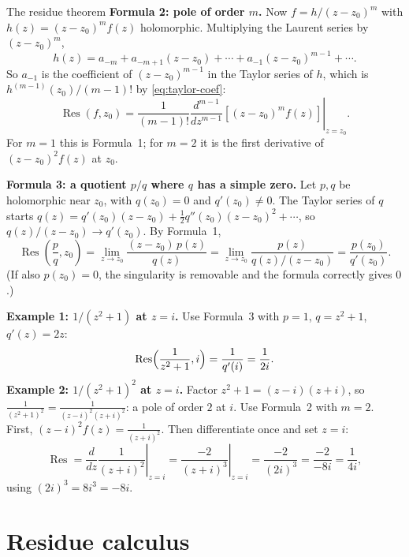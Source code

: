 \documentclass[11pt]{beamer}
\begin{document}
\begin{frame}[allowframebreaks=1.00]{The residue theorem}
\textbf{Formula 2: pole of order \(m\).} Now \(f=h/(z-z_0)^m\) with \(h(z)=(z-z_0)^mf(z)\) holomorphic.
Multiplying the Laurent series by \((z-z_0)^m\),
\[
 h(z)=a_{-m}+a_{-m+1}(z-z_0)+\cdots+a_{-1}(z-z_0)^{m-1}+\cdots .
\]
So \(a_{-1}\) is the coefficient of \((z-z_0)^{m-1}\) in the Taylor series of \(h\), which is
\(h^{(m-1)}(z_0)/(m-1)!\) by \eqref{eq:taylor-coef}:
\begin{equation}
 \operatorname{Res}(f,z_0)
 =\frac{1}{(m-1)!}
  \left.\frac{d^{m-1}}{dz^{m-1}}
  \left[(z-z_0)^m f(z)\right]\right|_{z=z_0}.
 \label{eq:res-order-m}
\end{equation}
For \(m=1\) this is Formula~1; for \(m=2\) it is the first derivative of \((z-z_0)^2f(z)\) at \(z_0\).


\textbf{Formula 3: a quotient \(p/q\) where \(q\) has a simple zero.} Let \(p,q\) be holomorphic near
\(z_0\), with \(q(z_0)=0\) and \(q'(z_0)\ne0\). The Taylor series of \(q\) starts
\(q(z)=q'(z_0)(z-z_0)+\frac12q''(z_0)(z-z_0)^2+\cdots\), so \(q(z)/(z-z_0)\to q'(z_0)\). By Formula~1,
\begin{equation}
 \operatorname{Res}\left(\frac pq,z_0\right)
 =\lim_{z\to z_0}\frac{(z-z_0)\,p(z)}{q(z)}
 =\lim_{z\to z_0}\frac{p(z)}{q(z)/(z-z_0)}
 =\frac{p(z_0)}{q'(z_0)}.
 \label{eq:res-ratio}
\end{equation}
(If also \(p(z_0)=0\), the singularity is removable and the formula correctly gives \(0\).)


\textbf{Example 1: \(1/(z^2+1)\) at \(z=i\).} Use Formula~3 with \(p=1\), \(q=z^2+1\), \(q'(z)=2z\):
\[
 \operatorname{Res}\Bigl(\frac1{z^2+1},i\Bigr)=\frac{1}{q'(i)}=\frac1{2i}.
\]
\textbf{Example 2: \(1/(z^2+1)^2\) at \(z=i\).} Factor \(z^2+1=(z-i)(z+i)\), so
\(\frac1{(z^2+1)^2}=\frac1{(z-i)^2(z+i)^2}\): a pole of order \(2\) at \(i\). Use Formula~2 with \(m=2\).
First, \((z-i)^2f(z)=\frac1{(z+i)^2}\). Then differentiate once and set \(z=i\):
\[
 \operatorname{Res}
 =\left.\frac{d}{dz}\frac1{(z+i)^2}\right|_{z=i}
  =\left.\frac{-2}{(z+i)^3}\right|_{z=i}
 =\frac{-2}{(2i)^3}
  =\frac{-2}{-8i}
  =\frac1{4i},
\]
using \((2i)^3=8i^3=-8i\).
\end{frame}



\section{Residue calculus}
\end{document}
